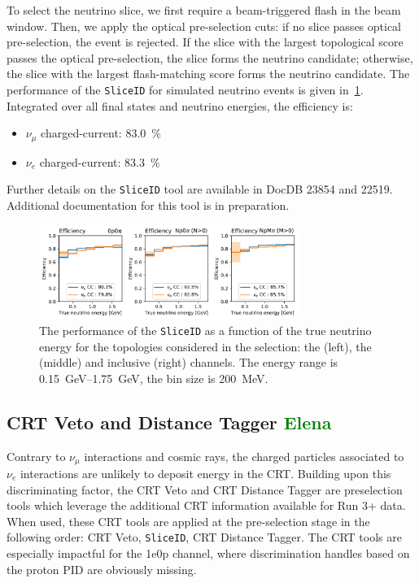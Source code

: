 To select the neutrino slice, we first require a beam-triggered flash in the beam window. 
Then, we apply the optical pre-selection cuts: if no slice passes optical pre-selection, the event is rejected. 
If the slice with the largest topological score passes the optical pre-selection, the slice forms the neutrino candidate; otherwise, the slice with the largest flash-matching score forms the neutrino candidate.
The performance of the \texttt{SliceID} for simulated neutrino events is given in~\cref{fig:sliceid}.
Integrated over all final states and neutrino energies, the efficiency is:
\begin{itemize}
    \item $\nu_\mu$ charged-current: \SI{83.0}{\%}
    \item $\nu_e$ charged-current: \SI{83.3}{\%}
\end{itemize}
Further details on the \texttt{SliceID} tool are available in DocDB 23854 and 22519. Additional documentation for this tool is in preparation.



\begin{figure}[H]
    \centering
    \includegraphics[width=0.75\textwidth]{NuId-Ch3/Images/sliceID.pdf}
    \caption{The performance of the \texttt{SliceID} as a function of the true neutrino energy for the topologies considered in the \nuecc selection: the \zpsel (left), the  \npsel (middle) and inclusive (right) channels. The energy range is \SIrange{0.15}{1.75}{\GeV}, the bin size is \SI{200}{\MeV}.}
    \label{fig:sliceid}
\end{figure}



\subsection{CRT Veto and Distance Tagger \textcolor{green}{Elena}}
\label{sec:sliceID:CRT}
Contrary to  $\nu_\mu$ interactions and cosmic rays, the charged particles associated to $\nu_e$ interactions are unlikely to deposit energy in the CRT. Building upon this discriminating factor, the CRT Veto and CRT Distance Tagger are preselection tools which leverage the additional CRT information available for Run 3+ data.
When used, these CRT tools are applied at the pre-selection stage in the following order: CRT Veto, \texttt{SliceID}, CRT Distance Tagger. The CRT tools are especially impactful for the 1e0p channel, where discrimination handles based on the proton PID are obviously missing. \\


